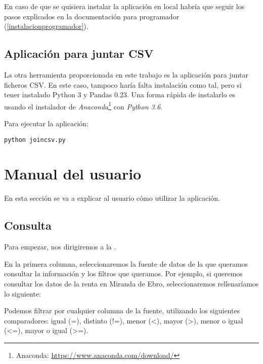 En caso de que se quisiera instalar la aplicación en local habría que seguir los pasos explicados en la documentación para programador (\ref{instalacionprogramador}). 

\subsection{Aplicación para juntar CSV}

La otra herramienta proporcionada en este trabajo es la aplicación para juntar ficheros CSV. En este caso, tampoco haría falta instalación como tal, pero si tener instalado Python 3 y Pandas 0.23. Una forma rápida de instalarlo es usando el instalador de \textit{Anaconda}\footnote{Anaconda: \href{https://www.anaconda.com/download/}{https://www.anaconda.com/download/}} con \textit{Python 3.6}.

Para ejecutar la aplicación:

\begin{lstlisting}
python joincsv.py
\end{lstlisting}

\newpage

\section{Manual del usuario}

En esta sección se va a explicar al usuario cómo utilizar la aplicación.

\subsection{Consulta} \label{consulta}

Para empezar, nos dirigiremos a la .


En la primera columna, seleccionaremos la fuente de datos de la que queramos consultar la información y los filtros que queramos. Por ejemplo, si queremos consultar los datos de la renta en Miranda de Ebro, seleccionaremos rellenaríamos lo siguiente:


Podemos filtrar por cualquier columna de la fuente, utilizando los siguientes comparadores: igual (=), distinto (!=), menor (<), mayor (>), menor o igual (<=), mayor o igual (>=).

